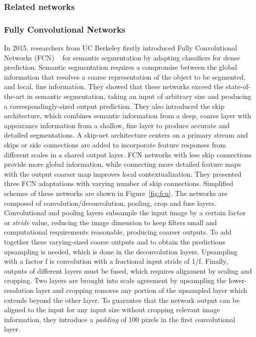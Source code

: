 \documentclass[preprint,authoryear,12pt]{elsarticle}
\begin{document}
\subsubsection{Related networks}
\label{sec:rel_net}
\subsubsection*{Fully Convolutional Networks} 
In 2015, researchers from UC Berkeley firstly introduced Fully Convolutional Networks (FCN) ~\citep{Lon15} for semantic segmentation by adapting classifiers for dense prediction. Semantic segmentation requires a compromise between the global information that resolves a coarse representation of the object to be segmented, and local, fine information. They showed that these networks exceed the state-of-the-art in semantic segmentation, taking an input of arbitrary size and producing a correspondingly-sized output prediction. They also introduced the skip architecture, which combines semantic information from a deep, coarse layer with appearance information from a shallow, fine layer to produce accurate and detailed segmentations. A skip-net architecture centers on a primary stream and skips or side connections are added to incorporate feature responses from different scales in a shared output layer. FCN networks with less skip connections provide more global information, while connecting more detailed feature maps with the output coarser map improves local contextualization. They presented three FCN adaptations with varying number of skip connections. Simplified schemes of these networks are shown in Figure~\ref{fig:fcn}. The networks are composed of convolution/deconvolution, pooling, crop and fuse layers. Convolutional and pooling layers subsample the input image by a certain factor or \textit{stride} value, reducing the image dimension to keep filters small and computational requirements reasonable, producing coarser outputs. To add together these varying-sized coarse outputs and to obtain the predictions upsampling is needed, which is done in the deconvolution layers. Upsampling with a factor f is convolution with a fractional input stride of 1/f. Finally, outputs of different layers must be fused, which requires alignment by scaling and cropping. Two layers are brought into scale agreement by upsampling the lower-resolution layer and cropping removes any portion of the upsampled layer which extends beyond the other layer. To guarantee that the network output can be aligned to the input for any input size without cropping relevant image information, they introduce a \textit{padding} of 100 pixels in the first convolutional layer.\par
\end{document}
